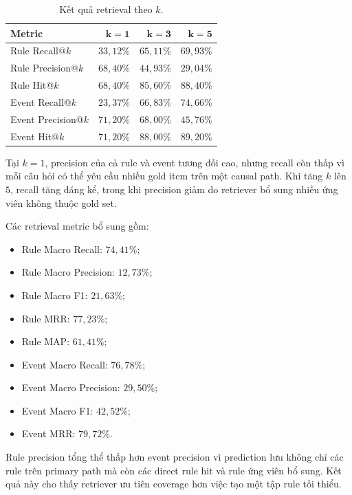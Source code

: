 \begin{table}[t]
    \centering
    \caption{Kết quả retrieval theo \(k\).}
    \label{tab:retrieval-results}
    \begin{tabular}{lrrr}
        \hline
        \textbf{Metric} & \(\mathbf{k=1}\) & \(\mathbf{k=3}\) &
        \(\mathbf{k=5}\) \\
        \hline
        Rule Recall@\(k\) &
        \(33{,}12\%\) & \(65{,}11\%\) & \(69{,}93\%\) \\
        Rule Precision@\(k\) &
        \(68{,}40\%\) & \(44{,}93\%\) & \(29{,}04\%\) \\
        Rule Hit@\(k\) &
        \(68{,}40\%\) & \(85{,}60\%\) & \(88{,}40\%\) \\
        \hline
        Event Recall@\(k\) &
        \(23{,}37\%\) & \(66{,}83\%\) & \(74{,}66\%\) \\
        Event Precision@\(k\) &
        \(71{,}20\%\) & \(68{,}00\%\) & \(45{,}76\%\) \\
        Event Hit@\(k\) &
        \(71{,}20\%\) & \(88{,}00\%\) & \(89{,}20\%\) \\
        \hline
    \end{tabular}
\end{table}

Tại \(k=1\), precision của cả rule và event tương đối cao, nhưng recall còn
thấp vì mỗi câu hỏi có thể yêu cầu nhiều gold item trên một causal path.
Khi tăng \(k\) lên \(5\), recall tăng đáng kể, trong khi precision giảm do
retriever bổ sung nhiều ứng viên không thuộc gold set.

Các retrieval metric bổ sung gồm:

\begin{itemize}
    \item Rule Macro Recall: \(74{,}41\%\);
    \item Rule Macro Precision: \(12{,}73\%\);
    \item Rule Macro F1: \(21{,}63\%\);
    \item Rule MRR: \(77{,}23\%\);
    \item Rule MAP: \(61{,}41\%\);
    \item Event Macro Recall: \(76{,}78\%\);
    \item Event Macro Precision: \(29{,}50\%\);
    \item Event Macro F1: \(42{,}52\%\);
    \item Event MRR: \(79{,}72\%\).
\end{itemize}

Rule precision tổng thể thấp hơn event precision vì prediction lưu không chỉ
các rule trên primary path mà còn các direct rule hit và rule ứng viên bổ
sung. Kết quả này cho thấy retriever ưu tiên coverage hơn việc tạo một tập
rule tối thiểu.

